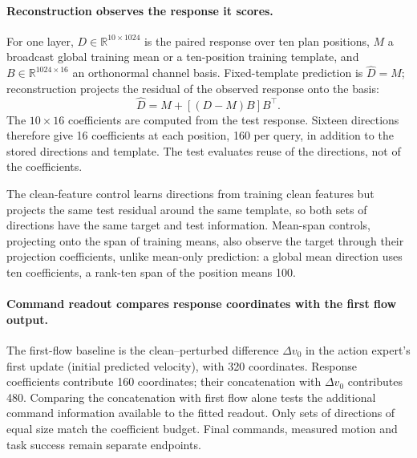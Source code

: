 \paragraph{Reconstruction observes the response it scores.}
For one layer, $D\in\mathbb{R}^{10\times1024}$ is the paired response over ten plan positions, $M$ a broadcast global training mean or a ten-position training template, and $B\in\mathbb{R}^{1024\times16}$ an orthonormal channel basis. Fixed-template prediction is $\widehat D=M$; reconstruction projects the residual of the observed response onto the basis:
\begin{equation}
 \widehat D=M+[(D-M)B]B^\top.
\end{equation}
The $10\times16$ coefficients are computed from the test response. Sixteen directions therefore give 16 coefficients at each position, 160 per query, in addition to the stored directions and template. The test evaluates reuse of the directions, not of the coefficients.

The clean-feature control learns directions from training clean features but projects the same test residual around the same template, so both sets of directions have the same target and test information. Mean-span controls, projecting onto the span of training means, also observe the target through their projection coefficients, unlike mean-only prediction: a global mean direction uses ten coefficients, a rank-ten span of the position means 100.

\paragraph{Command readout compares response coordinates with the first flow output.}
The first-flow baseline is the clean--perturbed difference $\Delta v_0$ in the action expert's first update (initial predicted velocity), with 320 coordinates. Response coefficients contribute 160 coordinates; their concatenation with $\Delta v_0$ contributes 480. Comparing the concatenation with first flow alone tests the additional command information available to the fitted readout. Only sets of directions of equal size match the coefficient budget. Final commands, measured motion and task success remain separate endpoints.
